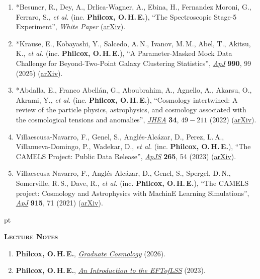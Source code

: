 \begin{enumerate}[resume]
    \item *Besuner, R., Dey, A., Drlica-Wagner, A., Ebina, H., Fernandez Moroni, G., Ferraro, S., \textit{et al.} (inc.\,\,\textbf{Philcox, O.\,H.\,E.}), ``The Spectroscopic Stage-5 Experiment'', \textit{White Paper} (\href{https://arxiv.org/abs/2503.07923}{arXiv}).
    \item *Krause, E., Kobayashi, Y., Salcedo, A.\,N., Ivanov, M.\,M., Abel, T., Akitsu, K., \textit{et al.} (inc.\,\,\textbf{Philcox, O.\,H.\,E.}), ``A Parameter-Masked Mock Data Challenge for Beyond-Two-Point Galaxy Clustering Statistics'', \href{https://doi.org/10.3847/1538-4357/ad781d}{\textit{ApJ}} \textbf{990}, 99 (2025) (\href{https://arxiv.org/abs/2405.02252}{arXiv}).
    \item *Abdalla, E., Franco Abell\'an, G., Aboubrahim, A., Agnello, A., Akarsu, O., Akrami, Y., \textit{et al.} (inc.\,\,\textbf{Philcox, O.\,H.\,E.}), ``Cosmology intertwined: A review of the particle physics, astrophysics, and cosmology associated with the cosmological tensions and anomalies'', \href{https://doi.org/10.1016/j.jheap.2022.04.002}{\textit{JHEA}} \textbf{34}, $49-211$ (2022) (\href{https://arxiv.org/abs/2203.06142}{arXiv}).
    \item Villaescusa-Navarro, F., Genel, S., Angl\'es-Alc\'azar, D., Perez, L.\,A., Villanueva-Domingo, P., Wadekar, D., \textit{et al.} (inc.\,\,\textbf{Philcox, O.\,H.\,E.}), ``The CAMELS Project: Public Data Release'', \href{https://doi.org/10.3847/1538-4365/acbf47}{\textit{ApJS}} \textbf{265}, 54 (2023) (\href{https://arxiv.org/abs/2201.01300}{arXiv}).
    \item Villaescusa-Navarro, F., Angl\'es-Alc\'azar, D., Genel, S., Spergel, D.\,N., Somerville, R.\,S., Dave, R., \textit{et al.} (inc.\,\,\textbf{Philcox, O.\,H.\,E.}), ``The CAMELS project: Cosmology and Astrophysics with MachinE Learning Simulations'', \href{https://doi.org/10.3847/1538-4357/abf7ba}{\textit{ApJ}} \textbf{915}, 71 (2021) (\href{https://arxiv.org/abs/2010.00619}{arXiv}).
\end{enumerate}

 pt 

\textbf{\textsc{Lecture Notes}}
\begin{enumerate}[resume]
\item\textbf{Philcox, O.\,H.\,E.}, \href{https://oliverphilcox.github.io/assets/pdf/graduate_cosmology.pdf}{\textit{Graduate Cosmology}} (2026).
\item\textbf{Philcox, O.\,H.\,E.}, \href{https://oliverphilcox.github.io/assets/pdf/eft_intro.pdf}{\textit{An Introduction to the EFTofLSS}} (2023).
\end{enumerate}